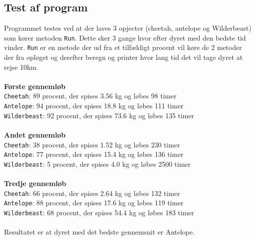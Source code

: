 \documentclass[a4paper,10pt]{article}
\begin{document}
\subsection{Test af program}
Programmet testes ved at der laves 3 opjecter (cheetah, antelope og Wilderbeast) som kører metoden \texttt{Run}. Dette sker 3 gange hvor efter dyret med den bedste tid vinder. \texttt{Run} er en metode der ud fra et tilfældigt procent vil køre de 2 metoder der fra opløget og derefter beregn og printer hvor lang tid det vil tage dyret at rejse 10km.
\\
\\
\textbf{Første gennemløb}
\\
\texttt{Cheetah}: 89 procent, der spises 3.56 kg og løbes 98 timer\\
\texttt{Antelope}: 94 procent, der spises 18.8 kg og løbes 111 timer\\
\texttt{Wilderbeast}: 92 procent, der spises 73.6 kg og løbes 135 timer
\\
\\
\textbf{Andet gennemløb}
\\
\texttt{Cheetah}: 38 procent, der spises 1.52 kg og løbes 230 timer\\
\texttt{Antelope}: 77 procent, der spises 15.4 kg og løbes 136 timer\\
\texttt{Wilderbeast}: 5 procent, der spises 4.0 kg og løbes 2500 timer
\\
\\
\textbf{Tredje gennemløb}
\\
\texttt{Cheetah}: 66 procent, der spises 2.64 kg og løbes 132 timer\\
\texttt{Antelope}: 88 procent, der spises 17.6 kg og løbes 119 timer\\
\texttt{Wilderbeast}: 68 procent, der spises 54.4 kg og løbes 183 timer
\\
\\
Resultatet er at dyret med det bedste gennemsnit er Antelope.
\end{document}
